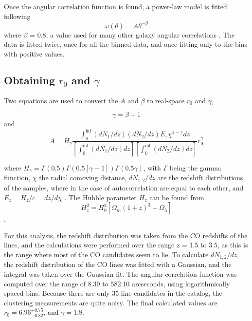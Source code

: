 
Once the angular correlation function is found, a power-law model is fitted following $$\omega(\theta) = A\theta^{-\beta} $$ where $\beta$ = 0.8, a value used for many other galaxy angular correlations \cite{hickox2011clustering}. The data is fitted twice, once for all the binned data, and once fitting only to the bins with positive values.

\subsection{Obtaining $r_0$ and $\gamma$}


Two equations are used to convert the $A$ and $\beta$ to real-space $r_0$ and $\gamma$, 

$$ \gamma = \beta + 1 $$ and $$ A = H_{\gamma}\frac{\int_{0}^{\inf} (dN_1/dz)(dN_2/dz)E_z\chi^{1 - \gamma} dz}{[\int_{0}^{\inf} (dN_1/dz)dz][\int_{0}^{\inf} (dN_2/dz)dz]}r_0^{\gamma}$$

where $H_{\gamma} = \Gamma(0.5)\Gamma(0.5[\gamma -1])\Gamma(0.5\gamma)$, with $\Gamma$ being the gamma function, $\chi$ the radial comoving distance, $dN_{1,2}/dz$ are the redshift distributions of the samples, where in the case of autocorrelation are equal to each other, and $E_z = H_z/c = dz/d\chi$ \cite{hickox2011clustering}. The Hubble parameter $H_z$ can be found from
$$H_z^2 = H_0^2[\Omega_m(1+z)^3 + \Omega_{\lambda}]$$ \cite{hickox2011clustering}.

For this analysis, the redshift distribution was taken from the CO redshifts of the lines, and the calculations were performed over the range z = 1.5 to 3.5, as this is the range where most of the CO candidates seem to lie. To calculate $dN_{1,2}/dz$, the redshift distribution of the CO lines was fitted with a Gaussian, and the integral was taken over the Gaussian fit. The angular correlation function was computed over the range of 8.39 to 582.10 arcseconds, using logarithmically spaced bins. Because there are only 35 line candidates in the catalog, the clustering measurements are quite noisy. The final calculated values are $r_0 = 6.96_{-0.82}^{+0.75}$, and $\gamma = 1.8$. 

